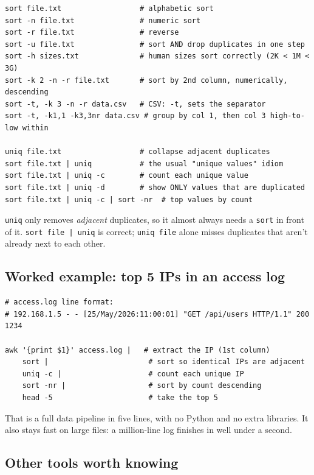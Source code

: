\documentclass[11pt,a4paper]{article}
\begin{document}
\begin{lstlisting}[style=bashstyle]
sort file.txt                  # alphabetic sort
sort -n file.txt               # numeric sort
sort -r file.txt               # reverse
sort -u file.txt               # sort AND drop duplicates in one step
sort -h sizes.txt              # human sizes sort correctly (2K < 1M < 3G)
sort -k 2 -n -r file.txt       # sort by 2nd column, numerically, descending
sort -t, -k 3 -n -r data.csv   # CSV: -t, sets the separator
sort -t, -k1,1 -k3,3nr data.csv # group by col 1, then col 3 high-to-low within

uniq file.txt                  # collapse adjacent duplicates
sort file.txt | uniq           # the usual "unique values" idiom
sort file.txt | uniq -c        # count each unique value
sort file.txt | uniq -d        # show ONLY values that are duplicated
sort file.txt | uniq -c | sort -nr  # top values by count
\end{lstlisting}

\begin{gotcha}
\texttt{uniq} only removes \emph{adjacent} duplicates, so it almost
always needs a \texttt{sort} in front of it. \texttt{sort file | uniq}
is correct; \texttt{uniq file} alone misses duplicates that aren't
already next to each other.
\end{gotcha}

\subsection*{Worked example: top 5 IPs in an access log}

\begin{lstlisting}[style=bashstyle]
# access.log line format:
# 192.168.1.5 - - [25/May/2026:11:00:01] "GET /api/users HTTP/1.1" 200 1234

awk '{print $1}' access.log |   # extract the IP (1st column)
    sort |                       # sort so identical IPs are adjacent
    uniq -c |                    # count each unique IP
    sort -nr |                   # sort by count descending
    head -5                      # take the top 5
\end{lstlisting}

That is a full data pipeline in five lines, with no Python and no
extra libraries. It also stays fast on large files: a million-line
log finishes in well under a second.

\subsection*{Other tools worth knowing}
\end{document}
